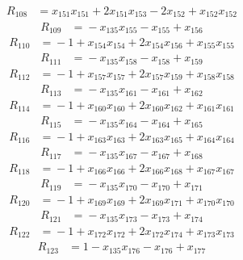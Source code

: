 \begin{align*}
R_{108}&={}x_{151}x_{151} +2x_{151}x_{153} -2x_{152} +x_{152}x_{152}
\end{align*}
\begin{align*}
R_{109}&={}-x_{135}x_{155} -x_{155} +x_{156}
\end{align*}
\begin{align*}
R_{110}&={}-1 +x_{154}x_{154} +2x_{154}x_{156} +x_{155}x_{155}
\end{align*}
\begin{align*}
R_{111}&={}-x_{135}x_{158} -x_{158} +x_{159}
\end{align*}
\begin{align*}
R_{112}&={}-1 +x_{157}x_{157} +2x_{157}x_{159} +x_{158}x_{158}
\end{align*}
\begin{align*}
R_{113}&={}-x_{135}x_{161} -x_{161} +x_{162}
\end{align*}
\begin{align*}
R_{114}&={}-1 +x_{160}x_{160} +2x_{160}x_{162} +x_{161}x_{161}
\end{align*}
\begin{align*}
R_{115}&={}-x_{135}x_{164} -x_{164} +x_{165}
\end{align*}
\begin{align*}
R_{116}&={}-1 +x_{163}x_{163} +2x_{163}x_{165} +x_{164}x_{164}
\end{align*}
\begin{align*}
R_{117}&={}-x_{135}x_{167} -x_{167} +x_{168}
\end{align*}
\begin{align*}
R_{118}&={}-1 +x_{166}x_{166} +2x_{166}x_{168} +x_{167}x_{167}
\end{align*}
\begin{align*}
R_{119}&={}-x_{135}x_{170} -x_{170} +x_{171}
\end{align*}
\begin{align*}
R_{120}&={}-1 +x_{169}x_{169} +2x_{169}x_{171} +x_{170}x_{170}
\end{align*}
\begin{align*}
R_{121}&={}-x_{135}x_{173} -x_{173} +x_{174}
\end{align*}
\begin{align*}
R_{122}&={}-1 +x_{172}x_{172} +2x_{172}x_{174} +x_{173}x_{173}
\end{align*}
\begin{align*}
R_{123}&={}1 -x_{135}x_{176} -x_{176} +x_{177}
\end{align*}
